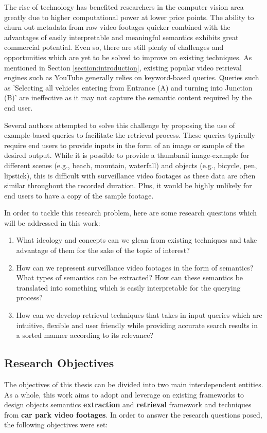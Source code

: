 The rise of technology has benefited researchers in the computer vision area greatly due to higher computational power at lower price points. The ability to churn out metadata from raw video footages quicker combined with the advantages of easily interpretable and meaningful semantics exhibits great commercial potential. Even so, there are still plenty of challenges and opportunities which are yet to be solved to improve on existing techniques. As mentioned in Section \ref{section:introduction}, existing popular video retrieval engines such as YouTube generally relies on keyword-based queries. Queries such as 'Selecting all vehicles entering from Entrance (A) and turning into Junction (B)' are ineffective as it may not capture the semantic content required by the end user.

Several authors attempted to solve this challenge by proposing the use of example-based queries \cite{zhang2017car, liu2016large, castanon2016retrieval} to facilitate the retrieval process.
These queries typically require end users to provide inputs in the form of an image or sample of the desired output. While it is possible to provide a thumbnail image-example for different scenes (e.g., beach, mountain, waterfall) and objects (e.g., bicycle, pen, lipstick), this is difficult with surveillance video footages as these data are often similar throughout the recorded duration. Plus, it would be highly unlikely for end users to have a copy of the sample footage.

In order to tackle this research problem, here are some research questions which will be addressed in this work:
\begin{enumerate}
\item What ideology and concepts can we glean from existing techniques and take advantage of them for the sake of the topic of interest?
\item How can we represent surveillance video footages in the form of semantics? What types of semantics can be extracted? How can these semantics be translated into something which is easily interpretable for the querying process?
\item How can we develop retrieval techniques that takes in input queries which are intuitive, flexible and user friendly while providing accurate search results in a sorted manner according to its relevance?
\end{enumerate}



\subsection{Research Objectives}
The objectives of this thesis can be divided into two main interdependent entities. As a whole, this work aims to adopt and leverage on existing frameworks to design objects semantics \textbf{extraction} and \textbf{retrieval} framework and techniques from \textbf{car park video footages}. In order to answer the research questions posed, the following objectives were set:

